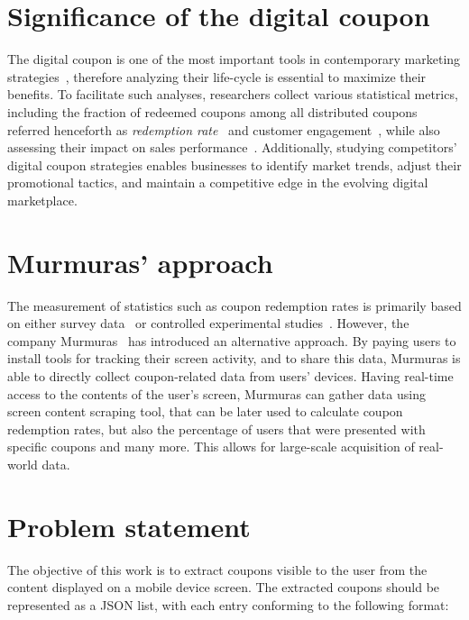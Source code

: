\documentclass[licencjacka,en]{pracamgr}
\begin{document}
\section{Significance of the digital coupon}
The digital coupon is one of the most important tools in contemporary marketing strategies~\cite{targeted_reminders}, therefore analyzing their life-cycle is essential to maximize their benefits. To facilitate such analyses, researchers collect various statistical metrics, including the fraction of redeemed coupons among all distributed coupons referred henceforth as \emph{redemption rate}~\cite{danaher2015} and customer engagement~\cite{jayadharshini2023}, while also assessing their impact on sales performance~\cite{jayadharshini2023}.  Additionally, studying competitors' digital coupon strategies enables businesses to identify market trends, adjust their promotional tactics, and maintain a competitive edge in the evolving digital marketplace.

\section{Murmuras' approach}
The measurement of statistics such as coupon redemption rates is primarily based on either survey data~\cite{nayal2021} or controlled experimental studies~\cite{danaher2015}. However, the company Murmuras~\cite{murmuras} has introduced an alternative approach. By paying users to install tools for tracking their screen activity, and to share this data, Murmuras is able to directly collect coupon-related data from users' devices. Having real-time access to the contents of the user’s screen, Murmuras can gather data using screen content scraping tool, that can be later used to calculate coupon redemption rates, but also the percentage of users that were presented with specific coupons and many more. This allows for large-scale acquisition of real-world data.

\section{Problem statement} \label{sec:coupon_model}

The objective of this work is to extract coupons visible to the user from the content displayed on a mobile device screen. The extracted coupons should be represented as a JSON list, with each entry conforming to the following format:
\end{document}

